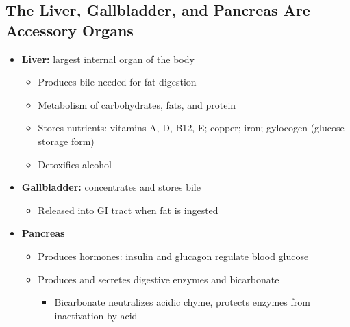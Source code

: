 \documentclass[12pt]{article}
\begin{document}
        \subsection{The Liver, Gallbladder, and Pancreas Are Accessory Organs}
            \begin{itemize}
                \item \textbf{Liver:} largest internal organ of the body
                    \begin{itemize}
                        \item Produces bile needed for fat digestion
                        \item Metabolism of carbohydrates, fats, and protein
                        \item Stores nutrients: vitamins A, D, B12, E; copper; iron; gylocogen (glucose storage form)
                        \item Detoxifies alcohol
                    \end{itemize}
                \item \textbf{Gallbladder:} concentrates and stores bile
                    \begin{itemize}
                        \item Released into GI tract when fat is ingested
                    \end{itemize}
                \item \textbf{Pancreas}
                    \begin{itemize}
                        \item Produces hormones: insulin and glucagon regulate blood glucose
                        \item Produces and secretes digestive enzymes and bicarbonate
                            \begin{itemize}
                                \item Bicarbonate neutralizes acidic chyme, protects enzymes from inactivation by acid
                            \end{itemize}
                    \end{itemize}
            \end{itemize}
        
\end{document}
